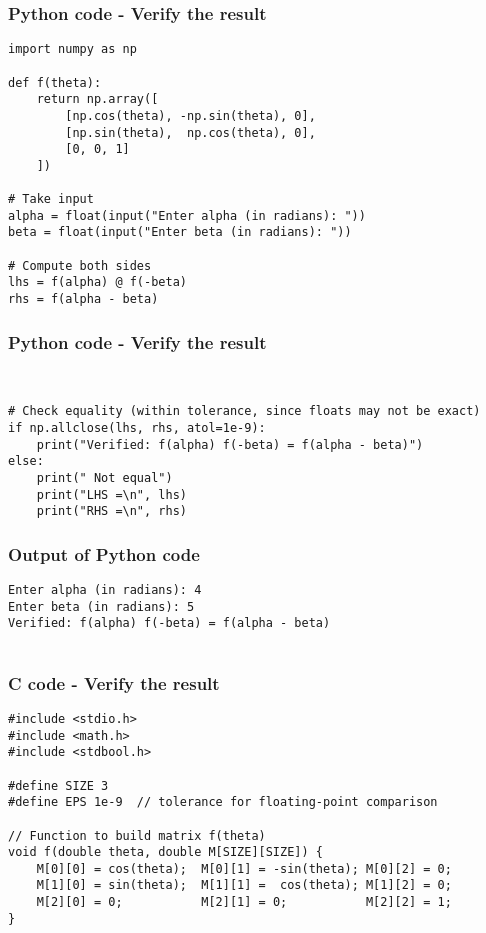 \documentclass{beamer}
\begin{document}
\begin{frame}[fragile]                            
\frametitle{Python code - Verify the result}                
\begin{lstlisting}
import numpy as np

def f(theta):
    return np.array([
        [np.cos(theta), -np.sin(theta), 0],
        [np.sin(theta),  np.cos(theta), 0],
        [0, 0, 1]
    ])

# Take input
alpha = float(input("Enter alpha (in radians): "))
beta = float(input("Enter beta (in radians): "))

# Compute both sides
lhs = f(alpha) @ f(-beta)
rhs = f(alpha - beta)
\end{lstlisting}
\end{frame}

\begin{frame}[fragile]    \frametitle{Python code - Verify the result}                
\begin{lstlisting}

   
# Check equality (within tolerance, since floats may not be exact)
if np.allclose(lhs, rhs, atol=1e-9):
    print("Verified: f(alpha) f(-beta) = f(alpha - beta)")
else:
    print(" Not equal")
    print("LHS =\n", lhs)
    print("RHS =\n", rhs)
\end{lstlisting}
\end{frame}

\begin{frame}[fragile]                            
\frametitle{Output of Python code}                
\begin{lstlisting}
Enter alpha (in radians): 4
Enter beta (in radians): 5
Verified: f(alpha) f(-beta) = f(alpha - beta)


\end{lstlisting}
\end{frame}

\begin{frame}[fragile]                            
\frametitle{C code - Verify the result}                
\begin{lstlisting}
#include <stdio.h>
#include <math.h>
#include <stdbool.h>

#define SIZE 3
#define EPS 1e-9  // tolerance for floating-point comparison

// Function to build matrix f(theta)
void f(double theta, double M[SIZE][SIZE]) {
    M[0][0] = cos(theta);  M[0][1] = -sin(theta); M[0][2] = 0;
    M[1][0] = sin(theta);  M[1][1] =  cos(theta); M[1][2] = 0;
    M[2][0] = 0;           M[2][1] = 0;           M[2][2] = 1;
}
\end{lstlisting}
\end{frame}
\end{document}
